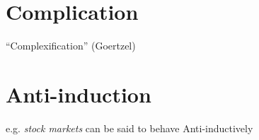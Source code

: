 \section{Complication}\label{sec:complication}

``Complexification'' (Goertzel)



\section{Anti-induction}\label{sec:anti_induction}

e.g. \emph{stock markets} can be said to behave Anti-inductively
